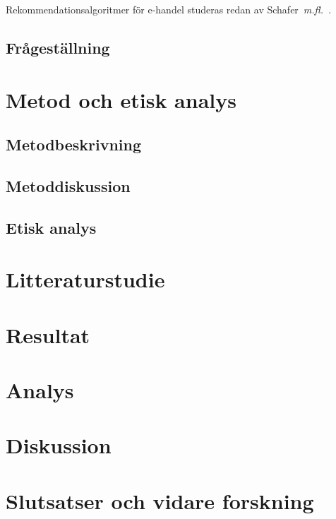 \documentclass[swedish]{maucsthesis}
\begin{document}
Rekommendationsalgoritmer för e-handel studeras redan av Schafer~{\em m.fl.}~\cite{Schafer1999}.


\subsection{Frågeställning}

\section{Metod och etisk analys}

\subsection{Metodbeskrivning}

\subsection{Metoddiskussion}

\subsection{Etisk analys}

\section{Litteraturstudie}

\section{Resultat}

\section{Analys}

\section{Diskussion}

\section{Slutsatser och vidare forskning}


%
\newpage
{}

\end{document}
